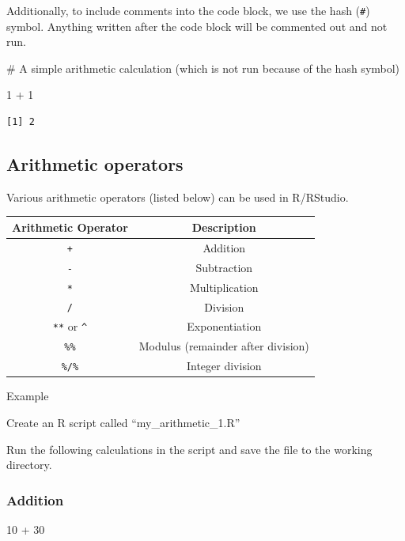 \documentclass[
  letterpaper,
  DIV=11,
  numbers=noendperiod]{scrreprt}
\newenvironment{Shaded}{\begin{snugshade}}{\end{snugshade}}
\newcommand{\CommentTok}[1]{\textcolor[rgb]{0.37,0.37,0.37}{#1}}
\newcommand{\DecValTok}[1]{\textcolor[rgb]{0.68,0.00,0.00}{#1}}
\newcommand{\SpecialCharTok}[1]{\textcolor[rgb]{0.37,0.37,0.37}{#1}}
\begin{document}
Additionally, to include comments into the code block, we use the hash
(\texttt{\#}) symbol. Anything written after the code block will be
commented out and not run.

\begin{Shaded}
\begin{Highlighting}[]
\CommentTok{\# A simple arithmetic calculation (which is not run because of the hash symbol)}

\DecValTok{1} \SpecialCharTok{+} \DecValTok{1}
\end{Highlighting}
\end{Shaded}

\begin{verbatim}
[1] 2
\end{verbatim}

\subsection{Arithmetic operators}\label{arithmetic-operators}

Various arithmetic operators (listed below) can be used in R/RStudio.

\begin{longtable}[]{@{}cc@{}}
\toprule\noalign{}
Arithmetic Operator & Description \\
\midrule\noalign{}
\endhead
\bottomrule\noalign{}
\endlastfoot
\texttt{+} & Addition \\
\texttt{-} & Subtraction \\
\texttt{*} & Multiplication \\
\texttt{/} & Division \\
\texttt{**} or \texttt{\^{}} & Exponentiation \\
\texttt{\%\%} & Modulus (remainder after division) \\
\texttt{\%/\%} & Integer division \\
\end{longtable}

Example

Create an R script called ``my\_arithmetic\_1.R''

Run the following calculations in the script and save the file to the
working directory.

\subsubsection{Addition}\label{addition}

\begin{Shaded}
\begin{Highlighting}[]
\DecValTok{10} \SpecialCharTok{+} \DecValTok{30}
\end{Highlighting}
\end{Shaded}
\end{document}
